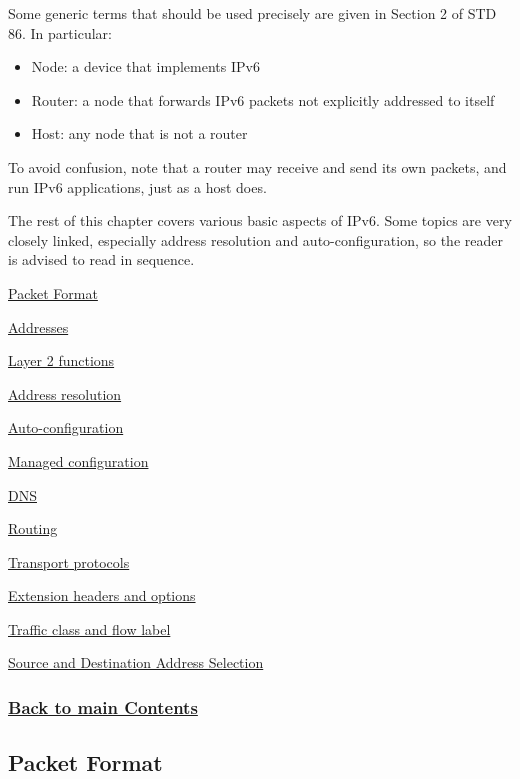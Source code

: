 \documentclass[
]{article}
\begin{document}
Some generic terms that should be used precisely are given in Section 2
of STD 86. In particular:

\begin{itemize}
\item
  Node: a device that implements IPv6
\item
  Router: a node that forwards IPv6 packets not explicitly addressed to
  itself
\item
  Host: any node that is not a router
\end{itemize}

To avoid confusion, note that a router may receive and send its own
packets, and run IPv6 applications, just as a host does.

The rest of this chapter covers various basic aspects of IPv6. Some
topics are very closely linked, especially address resolution and
auto-configuration, so the reader is advised to read in sequence.

\hyperref[packet-format]{Packet Format}

\hyperref[addresses]{Addresses}

\hyperref[layer-2-functions]{Layer 2 functions}

\hyperref[address-resolution]{Address resolution}

\hyperref[auto-configuration]{Auto-configuration}

\hyperref[managed-configuration]{Managed configuration}

\hyperref[dns]{DNS}

\hyperref[routing]{Routing}

\hyperref[transport-protocols]{Transport protocols}

\hyperref[extension-headers-and-options]{Extension headers and options}

\hyperref[traffic-class-and-flow-label]{Traffic class and flow label}

\hyperref[source-and-destination-address-selection]{Source and
Destination Address Selection}

\subsubsection{\texorpdfstring{\hyperref[list-of-contents]{Back to main
Contents}}{Back to main Contents}}\label{back-to-main-contents-1}

\pagebreak

\subsection{Packet Format}\label{packet-format}
\end{document}
